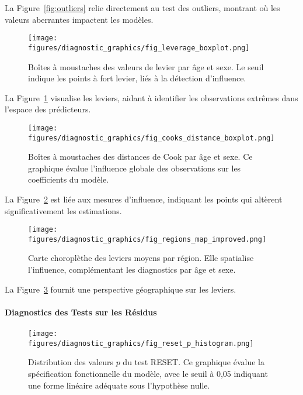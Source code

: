 La Figure~\ref{fig:outliers} relie directement au test des outliers, montrant où les valeurs aberrantes impactent les modèles.

\begin{figure}[H]
	\centering
	\texttt{[image: figures/diagnostic\_graphics/fig\_leverage\_boxplot.png]}
	\caption{Boîtes à moustaches des valeurs de levier par âge et sexe. Le seuil indique les points à fort levier, liés à la détection d'influence.}
	\label{fig:leverage}
\end{figure}

La Figure~\ref{fig:leverage} visualise les leviers, aidant à identifier les observations extrêmes dans l'espace des prédicteurs.

\begin{figure}[H]
	\centering
	\texttt{[image: figures/diagnostic\_graphics/fig\_cooks\_distance\_boxplot.png]}
	\caption{Boîtes à moustaches des distances de Cook par âge et sexe. Ce graphique évalue l'influence globale des observations sur les coefficients du modèle.}
	\label{fig:cooks}
\end{figure}

La Figure~\ref{fig:cooks} est liée aux mesures d'influence, indiquant les points qui altèrent significativement les estimations.

\begin{figure}[H]
	\centering
	\texttt{[image: figures/diagnostic\_graphics/fig\_regions\_map\_improved.png]}
	\caption{Carte choroplèthe des leviers moyens par région. Elle spatialise l'influence, complémentant les diagnostics par âge et sexe.}
	\label{fig:map}
\end{figure}

La Figure~\ref{fig:map} fournit une perspective géographique sur les leviers.

\paragraph{Diagnostics des Tests sur les Résidus}

\begin{figure}[H]
	\centering
	\texttt{[image: figures/diagnostic\_graphics/fig\_reset\_p\_histogram.png]}
	\caption{Distribution des valeurs $p$ du test RESET. Ce graphique évalue la spécification fonctionnelle du modèle, avec le seuil à 0,05 indiquant une forme linéaire adéquate sous l'hypothèse nulle.}
	\label{fig:reset_hist}
\end{figure}

